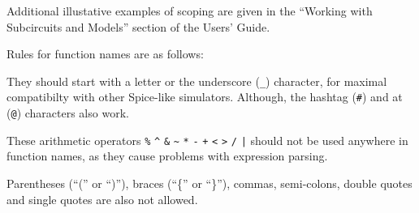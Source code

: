\begin{Command}
Additional illustative examples of scoping are given in the
``Working with Subcircuits and Models'' section of the \Xyce{} Users'
Guide\UsersGuide.

Rules for function names are as follows:
\begin{XyceItemize}
\item They should start with a letter or the underscore (\verb|_|) character,
for maximal compatibilty with other Spice-like simulators.  Although, the
hashtag (\verb|#|) and at (\verb|@|) characters also work.
\item These arithmetic operators \verb|%| \verb|^| \verb|&| \verb|~|
\verb|*| \verb|-| \verb|+| \verb|<| \verb|>| \verb|/| \verb+|+ should not
be used anywhere in function names, as they cause problems with expression
parsing.
\item Parentheses (``('' or ``)''), braces (``\{'' or ``\}''), commas,
semi-colons, double quotes and single quotes are also not allowed.
\end{XyceItemize}

\end{Command}

